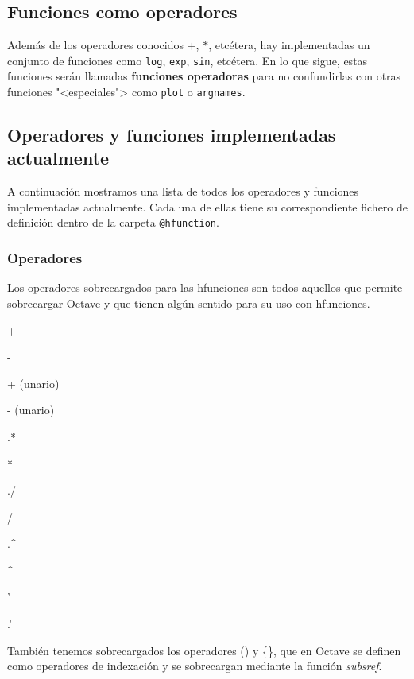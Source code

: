 \documentclass{article}
\begin{document}
\subsection{Funciones como operadores}
\label{ssec:funop}
Además de los operadores conocidos $+$, $*$, etcétera, hay
implementadas un conjunto de funciones como \texttt{log},
\texttt{exp}, \texttt{sin}, etcétera. En lo que sigue, estas funciones
serán llamadas \textbf{funciones operadoras} para no confundirlas con
otras funciones "<especiales"> como \texttt{plot} o \texttt{argnames}.

\subsection{Operadores y funciones implementadas actualmente}
\label{ssec:impl}
A continuación mostramos una lista de todos los operadores y funciones
implementadas actualmente. Cada una de ellas tiene su correspondiente
fichero de definición dentro de la carpeta \texttt{@hfunction}.

\subsubsection{Operadores}
\label{sssec:ops}
Los operadores sobrecargados para las hfunciones son todos aquellos
que permite sobrecargar Octave y que tienen algún sentido para su uso
con hfunciones.

\begin{multicols}{3}
\begin{description}[font=\normalfont\ttfamily]
\item[plus] +
\item[minus] -
\item[uplus] + (unario)
\item[uminus] - (unario)
\item[times] .*
\item[mtimes] *
\item[rdivide] ./
\item[mrdivide] /
\item[power] .\textasciicircum
\item[mpower] \textasciicircum
\item[ctranspose] '
\item[transpose] .'
\end{description}
\end{multicols}

También tenemos sobrecargados los operadores () y \{\}, que en
Octave se definen como operadores de indexación y se sobrecargan
mediante la función \textit{subsref}.
\end{document}
